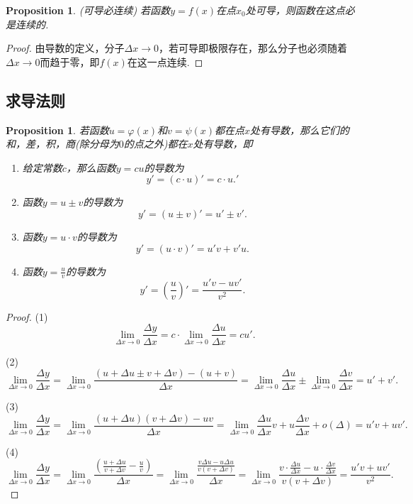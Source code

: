 \documentclass{article}
\newtheorem{proposition}[theorem]{Proposition}
\begin{document}
\begin{proposition}
\rm {\color{red} (可导必连续)} 若函数$y = f(x)$在点$x_0$处可导，则函数在这点必是连续的.
\end{proposition}

\begin{proof}
由导数的定义，分子$\Delta x \to 0$，若可导即极限存在，那么分子也必须随着$\Delta x \to 0$而趋于零，即$f(x)$在这一点连续. 
\end{proof}

\subsection{求导法则}

\begin{proposition}
\rm 若函数$u=\varphi(x)$和$v=\psi(x)$都在点$x$处有导数，那么它们的和，差，积，商(除分母为$0$的点之外)都在$x$处有导数，即
\begin{enumerate}
	\item 给定常数$c$，那么函数$y = cu$的导数为 
	$$
	y' = (c\cdot u)' = c \cdot u.'
	$$
	\item 函数$y = u \pm v$的导数为
	$$
	y' = (u \pm v)' = u' \pm v'.
	$$
	\item 函数$y = u \cdot v$的导数为
	$$
	y' = (u \cdot v)' = u'v + v'u.
	$$
	\item 函数$y = \frac{u}{v}$的导数为
	$$
	y' = (\frac{u}{v})' = \frac{u'v - uv'}{v^2}.
	$$
\end{enumerate}
\end{proposition}

\begin{proof}
{\color{red}(1)}
$$
\lim\limits_{\Delta x \rightarrow 0} \frac{\Delta y}{\Delta x} = c \cdot \lim\limits_{\Delta x \rightarrow 0} \frac{\Delta u}{\Delta x} = cu'.
$$

{\color{red}(2)}
$$
\lim\limits_{\Delta x \rightarrow 0} \frac{\Delta y}{\Delta x} = \lim\limits_{\Delta x \rightarrow 0} \frac{(u+\Delta u \pm v+\Delta v)-(u+v)}{\Delta x} = \lim\limits_{\Delta x \rightarrow 0} \frac{\Delta u}{\Delta x} \pm \lim\limits_{\Delta x \rightarrow 0} \frac{\Delta v}{\Delta x} = u'+v'.
$$

{\color{red}(3)}
$$
\lim\limits_{\Delta x \rightarrow 0} \frac{\Delta y}{\Delta x} = \lim\limits_{\Delta x \rightarrow 0} \frac{(u+\Delta u)(v+\Delta v)-uv}{\Delta x} = \lim\limits_{\Delta x \rightarrow 0} \frac{\Delta u}{\Delta x}v + u\frac{\Delta v}{\Delta x} + o(\Delta) = u'v + uv'.
$$

{\color{red}(4)}
$$
\lim\limits_{\Delta x \rightarrow 0} \frac{\Delta y}{\Delta x} = \lim\limits_{\Delta x \rightarrow 0} \frac{(\frac{u+\Delta u}{v+\Delta v} - \frac{u}{v})}{\Delta x} = \lim\limits_{\Delta x \rightarrow 0} \frac{\frac{v\Delta u-u\Delta u}{v(v+\Delta v)}}{\Delta x} = \lim\limits_{\Delta x \rightarrow 0} \frac{v\cdot \frac{\Delta u}{\Delta x}- u \cdot \frac{\Delta v}{\Delta x}}{v(v+\Delta v)} = \frac{u'v + uv'}{v^2}.
$$
\end{proof}
\end{document}

